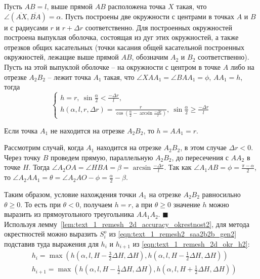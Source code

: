 \begin{lemma}\label{lem:text_1_remesh_2d_accuracy_okrestnost2}
Пусть $AB = l$, выше прямой $AB$ расположена точка $X$ такая, что $\angle (\overline{AX}, \overline{BA}) = \alpha$.
Пусть построены две окружности с центрами в точках $A$ и $B$ и с радиусами $r$ и $r + \Delta r$ соответственно.
Для построенных окружностей построена выпуклая оболочка, состоящая из дуг этих окружностей, а также отрезков общих касательных (точки касания общей касательной построенных окружностей, лежащие выше прямой $AB$, обозначим $A_2$ и $B_2$ соответственно).
Пусть на этой выпуклой оболочке -- на окружности с центром в точке $A$ либо на отрезке $A_2B_2$ -- лежит точка $A_1$ такая, что $\angle XAA_1 = \angle BAA_1 = \phi$, $AA_1 = h$, тогда 
\begin{equation}
	\begin{cases}\label{eqn:text_1_remesh_2d_okr_h2}
		h = r, \ \sin \frac{\alpha}{2} < \frac{-\Delta r}{l}, \\
		h(\alpha, l, r, \Delta r) = \frac{r}{\cos \left( \frac{\alpha}{2} - \arcsin \frac{-\Delta r}{l} \right)}, \ \sin \frac{\alpha}{2} \ge \frac{-\Delta r}{l}
	\end{cases}
\end{equation}
\end{lemma}

Если точка $A_1$ не находится на отрезке $A_2B_2$, то $h = AA_1 = r$.

Рассмотрим случай, когда $A_1$ находится на отрезке $A_2B_2$, в этом случае $\Delta r < 0$.
Через точку $B$ проведем прямую, параллельную $A_2B_2$, до пересечения с $AA_2$ в точке $H$.
Тогда $\angle A_2OA = \angle HBA = \beta = \arcsin \frac{-\Delta r}{l}$.
Так как $\angle A_1AB = \phi = \frac{\pi - \alpha}{2}$, то $\angle A_2AA_1 = \theta = \angle A_2AO - \phi = \frac{\alpha}{2} - \beta$.

Таким образом, условие нахождения точки $A_1$ на отрезке $A_2B_2$ равносильно $\theta \ge 0$.
То есть при $\theta < 0$, получаем $h = r$, а при $\theta \ge 0$ значение $h$ можно выразить из прямоугольного треугольника $AA_1A_2$.
$\blacksquare$\\

Используя лемму~\ref{lem:text_1_remesh_2d_accuracy_okrestnost2}, для метода окрестностей можно выразить $S_i^o$ из \eqref{eqn:text_1_remesh2_saa2b2b_gen2} подставив туда выражения для $h_i$ и $h_{i + 1}$ из \eqref{eqn:text_1_remesh_2d_okr_h2}:
\begin{equation}
	\begin{aligned}
	& h_i = \max \left( h \left( \alpha, l, H - \frac{3}{2}\Delta H, \Delta H \right), h \left( \alpha, l, H - \frac{1}{2}\Delta H, \Delta H \right) \right) \\
	& h_{i + 1} = \max \left( h \left( \alpha, l, H - \frac{1}{2}\Delta H, \Delta H \right), h \left( \alpha, l, H + \frac{1}{2}\Delta H, \Delta H \right) \right)
	\end{aligned}
\end{equation}

